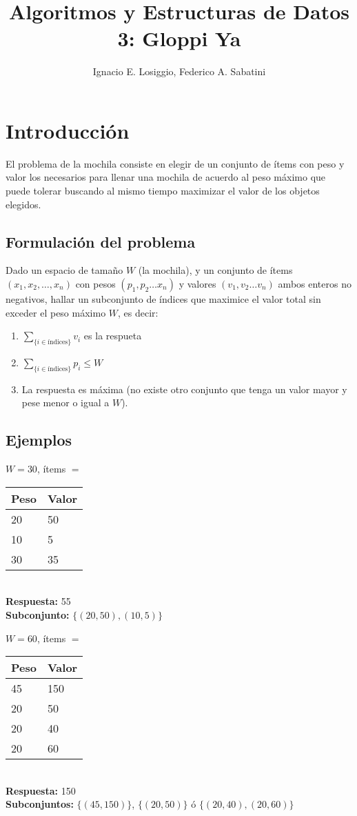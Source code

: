 \documentclass[fleqn, 11pt]{article}
\title{Algoritmos y Estructuras de Datos 3: Gloppi Ya}
\author{Ignacio E. Losiggio, Federico A. Sabatini}
\begin{document}
\maketitle

\tableofcontents

\section{Introducción}

El problema de la mochila consiste en elegir de un conjunto de ítems con peso y
valor los necesarios para llenar una mochila de acuerdo al peso máximo que
puede tolerar buscando al mismo tiempo maximizar el valor de los objetos
elegidos.

\subsection{Formulación del problema}

Dado un espacio de tamaño $W$ (la mochila), y un conjunto de ítems $(x_1, x_2,
\dots, x_n)$ con pesos $(p_1, p_2 \dots x_n)$ y valores $(v_1, v_2 \dots v_n)$
ambos enteros no negativos, hallar un subconjunto de índices que maximice el
valor total sin exceder el peso máximo $W$, es decir:

\begin{enumerate}
	\item $\sum_{\{i \in \text{índices}\}} v_i$ es la respueta
	\item $\sum_{\{i \in \text{índices}\}} p_i \le W$
	\item La respuesta es máxima (no existe otro conjunto que tenga un
	valor mayor y  pese menor o igual a $W$).
\end{enumerate}

\subsection{Ejemplos}

$W = 30$, ítems $=$
\begin{tabular}{l l}
	Peso  & Valor \\ \toprule
	20 & 50 \\
	10 & 5  \\
	30 & 35
\end{tabular} \\
\textbf{Respuesta:} 55 \\
\textbf{Subconjunto:} $\{(20,50), (10,5)\}$

$W = 60$, ítems $=$
\begin{tabular}{l l}
	Peso & Valor \\ \toprule
	45 & 150 \\
	20 & 50 \\
	20 & 40 \\
	20 & 60
\end{tabular} \\
\textbf{Respuesta:} 150 \\
\textbf{Subconjuntos:} $\{(45, 150)\}$, $\{(20, 50)\}$ ó $\{(20, 40), (20,
60)\}$
\end{document}
